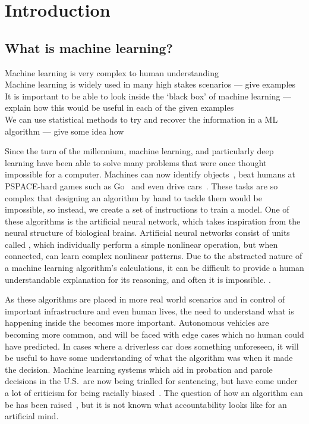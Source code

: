 
\chapter{Introduction}

\section{What is machine learning?}
\begin{todo}
	Machine learning is very complex to human understanding \\
	Machine learning is widely used in many high stakes scenarios --- give examples \\
	It is important to be able to look inside the `black box' of machine learning --- explain how this would be useful in each of the given examples \\
	We can use statistical methods to try and recover the information in a ML algorithm --- give some idea how
\end{todo}
   
    

Since the turn of the millennium, machine learning, and particularly deep learning have been able to solve many problems that were once thought impossible for a computer.
Machines can now identify objects~\autocite{li2018}, beat humans at PSPACE-hard games such as Go~\autocite{chao2018} and even drive cars~\autocite{gerla2014}.
These tasks are so complex that designing an algorithm by hand to tackle them would be impossible, so instead, we create a set of instructions to train a model.
One of these  algorithms is the artificial neural network, which takes inspiration from the neural structure of biological brains.
Artificial neural networks consist of units called , which individually perform a simple nonlinear operation, but when connected, can learn complex nonlinear patterns.
Due to the abstracted nature of a machine learning algorithm's calculations, it can be difficult to provide a human understandable explanation for its reasoning, and often it is impossible.
.

As these algorithms are placed in more real world scenarios and in control of important infrastructure and even human lives, the need to understand what is happening inside the  becomes more important.
Autonomous vehicles are becoming more common, and will be faced with edge cases which no human could have predicted.
In cases where a driverless car does something unforeseen, it will be useful to have some understanding of what the algorithm was  when it made the decision.
Machine learning systems which aid in probation and parole decisions in the U.S.\ are now being trialled for sentencing, but have come under a lot of criticism for being racially biased~\autocite{christin2015}.
The question of how an algorithm can be  has been raised~\autocite[9]{christin2015}, but it is not known what accountability looks like for an artificial mind.
